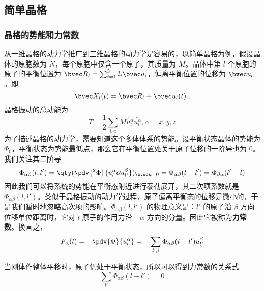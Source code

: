 
\subsection{简单晶格}
\subsubsection{晶格的势能和力常数}
从一维晶格的动力学推广到三维晶格的动力学是容易的，以简单晶格为例，假设晶体的原胞数为 $N$，每个原胞中仅含一个原子，其质量为 $M$。晶体中第 $l$ 个原胞的原子的平衡位置为 $\bvec R_l=\sum_{i=1}^3 l_i\bvec a_i$，偏离平衡位置的位移为 $\bvec u_l$。即
\begin{equation}
\bvec X_l(t)=\bvec R_l+\bvec u_l(t)~.
\end{equation}
晶格振动的总动能为
\begin{equation}
T=\frac{1}{2}\sum_{l,a} M \dot{u_l^\alpha}\dot{u_l^\alpha},\alpha=x,y,z
\end{equation}
为了描述晶格的动力学，需要知道这个多体体系的势能。设平衡状态晶体的势能为 $\Phi_0$，平衡状态为势能最低点，那么它在平衡位置处关于原子位移的一阶导也为 $0$。我们关注其二阶导
\begin{equation}
\Phi_{\alpha\beta}(l,l')=\qty(\pdv{^2\Phi}{u_l^\alpha\partial u_{l'}^\beta})_{\bvec u=0}=\Phi_{\alpha\beta}(l-l')=\Phi_{\beta\alpha}(l'-l)
\end{equation}
因此我们可以将系统的势能在平衡态附近进行泰勒展开，其二次项系数就是 $\Phi_{\alpha\beta}(l,l')$。类似于晶格振动的动力学过程，原子偏离平衡态的位移是微小的，于是我们暂时地忽略高次项的影响。$\Phi_{\alpha\beta}(l,l')$ 的物理意义是：$l'$ 的原子沿 $\beta$ 方向位移单位距离时，它对 $l$ 原子的作用力沿 $-\alpha$ 方向的分量。因此它被称为\textbf{力常数}。换言之，
\begin{equation}\label{eq_latdyn_1}
F_\alpha(l)=-\pdv{\Phi}{u_l^\alpha}=-\sum_{l'\beta}\Phi_{\alpha\beta}(l-l')u_{l'}^\beta
\end{equation}

当刚体作整体平移时，原子仍处于平衡状态，所以可以得到力常数的关系式
\begin{equation}
\sum_{l'}\Phi_{\alpha\beta}(l-l')=0
\end{equation}
